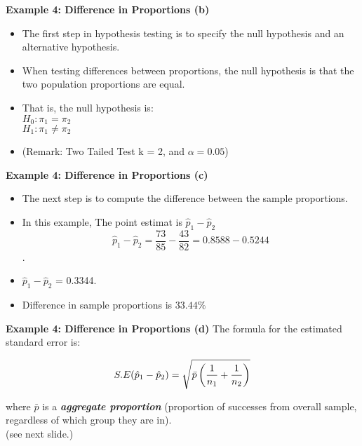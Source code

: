 \documentclass[a4]{beamer}
\begin{document}

\noindent \textbf{Example 4: Difference in Proportions (b)}
\vspace{-1cm}
\begin{itemize}
\item
The first step in hypothesis testing is to specify the null hypothesis and an alternative hypothesis.
\item When testing differences between proportions, the null hypothesis is that the two population proportions are equal.
\item That is, the null hypothesis is:\\
$H_0: \pi_1 = \pi_2$\\
$H_1: \pi_1 \neq \pi_2$\\
\item (Remark: Two Tailed Test k = 2, and $\alpha = 0.05$)
\end{itemize}



\noindent \textbf{Example 4: Difference in Proportions (c)}
\vspace{-1cm}
\begin{itemize}
\item The next step is to compute the difference between the sample proportions.
\item In this example, The point estimat is $\hat{p}_1 - \hat{p}_2$ 
\[\hat{p}_1 - \hat{p}_2 = \frac{73}{85} - \frac{43}{82} = 0.8588 - 0.5244\].
\item $\hat{p}_1 - \hat{p}_2$ =  0.3344.
\item Difference in sample proportions is $33.44\%$
\end{itemize}





\noindent \textbf{Example 4: Difference in Proportions (d)}
\vspace{-1cm}
The formula for the estimated standard error is:

\[ S.E (\hat{p}_1 - \hat{p}_2)  = \sqrt{\bar{p} \left( {1 \over n_1} + {1 \over n_2}  \right)} \]


where $\bar{p}$ is a \textit{\textbf{aggregate proportion}} (proportion of successes from overall sample, regardless of which group they are in).
\\
(see next slide.)
\end{document}
